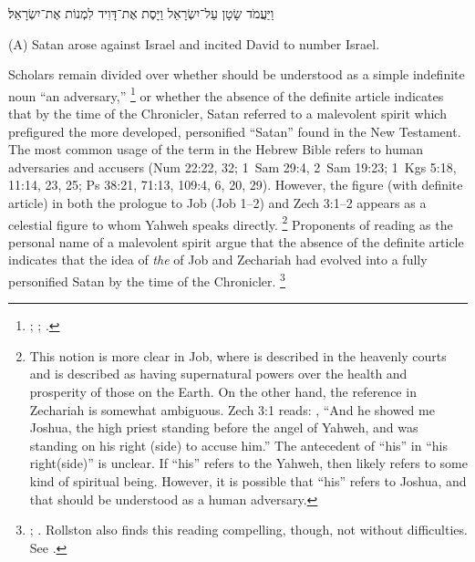 \begin{hebrewtext}
    וַיַּעֲמֹד שָׂטָן עַל־יִשְׂרָאֵל וַיָּסֶת אֶת־דָּוִיד לִמְנוֹת אֶת־יִשְׂרָאֵל׃
\end{hebrewtext}
\begin{translation}
    (A) Satan arose against Israel and incited David to number Israel.
\end{translation}
\noindent
Scholars remain divided over whether  should be understood as a simple indefinite noun ``an adversary,''%
    \footnote{%
        \cite{stokes_jbl2009};
        \cite[114--117]{japhet2009};
        \cite[370--390]{japhet1993}.}
or whether the absence of the definite article indicates that by the time of the Chronicler, Satan referred to a malevolent spirit which prefigured the more developed, personified ``Satan'' found in the New Testament.%
    \autocite[4--5]{rollston_keith-stuckenbruck2016}
The most common usage of the term  in the Hebrew Bible refers to human adversaries and accusers (Num 22:22, 32; 1~Sam 29:4, 2~Sam 19:23; 1~Kgs 5:18, 11:14, 23, 25; Ps 38:21, 71:13, 109:4, 6, 20, 29). However, the figure  (with definite article) in both the prologue to Job (Job 1--2) and Zech 3:1--2 appears as a celestial figure to whom Yahweh speaks directly.
    \footnote{This notion is more clear in Job, where  is described in the heavenly courts and is described as having supernatural powers over the health and prosperity of those on the Earth. On the other hand, the reference in Zechariah is somewhat ambiguous. Zech 3:1 reads: , ``And he showed me Joshua, the high priest standing before the angel of Yahweh, and  was standing on his right (side) to accuse him.'' The antecedent of ``his'' in ``his right(side)'' is unclear. If ``his'' refers to the  Yahweh, then  likely refers to some kind of spiritual being. However, it is possible that ``his'' refers to Joshua, and that  should be understood as a human adversary.}
Proponents of reading  as the personal name of a malevolent spirit argue that the absence of the definite article indicates that the idea of \emph{the}  of Job and Zechariah had evolved into a fully personified Satan by the time of the Chronicler.%
    \footnote{%
        \cite[216--217]{braun1986};
        \cite[107]{coggins1976}. Rollston also finds this reading compelling, though, not without difficulties. See 
        \cite[4--5]{rollston_keith-stuckenbruck2016}.}
